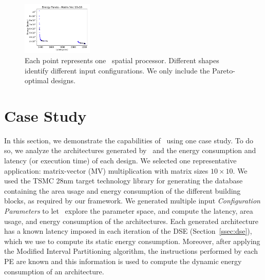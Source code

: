 \begin{figure}[ht]
\centering
  \includegraphics[width=0.3\textwidth]{graphs/EnergyParetoMatrixVec10_v3.pdf}
    \caption{\small Each point represents one \frameworkname~spatial processor. Different shapes identify different input configurations. We only include the Pareto-optimal designs.}
\label{fig:sram_vs_mram_pareto_vec}
\end{figure}
\vspace{-1mm}
\section{Case Study}
\label{sec:case_studies}
In this section, we demonstrate the capabilities of \frameworkname~using one case study. To do so, we analyze the architectures generated by \frameworkname~and the energy consumption and latency (or execution time) of each design.
We selected one representative application: matrix-vector (MV) multiplication with matrix sizes $10\times10$. We used the TSMC 28nm target technology library for generating the database containing the area usage and energy consumption of the different building blocks, as required by our framework.
We generated multiple input \textit{Configuration Parameters} to let \frameworkname~explore the parameter space, and compute the latency, area usage, and energy consumption of the architectures. Each generated architecture has a known latency imposed in each iteration of the DSE (Section~\ref{ssec:dse}), which we use to compute its static energy consumption. Moreover, after applying the Modified Interval Partitioning algorithm, the instructions performed by each PE are known and this information is used to compute the dynamic energy consumption of an architecture.

